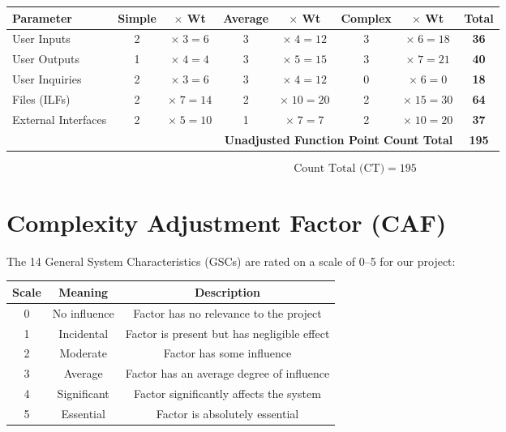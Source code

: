 \documentclass[11pt, a4paper]{article}
\begin{document}
\begin{center}
\renewcommand{\arraystretch}{1.3}
\begin{tabular}{|l|c|c|c|c|c|c|c|}
\hline
\textbf{Parameter} & \textbf{Simple} & \textbf{$\times$ Wt} & \textbf{Average} & \textbf{$\times$ Wt} & \textbf{Complex} & \textbf{$\times$ Wt} & \textbf{Total} \\ \hline
User Inputs            & 2 & $\times\;3 = 6$   & 3 & $\times\;4 = 12$  & 3 & $\times\;6 = 18$  & \textbf{36} \\ \hline
User Outputs           & 1 & $\times\;4 = 4$   & 3 & $\times\;5 = 15$  & 3 & $\times\;7 = 21$  & \textbf{40} \\ \hline
User Inquiries         & 2 & $\times\;3 = 6$   & 3 & $\times\;4 = 12$  & 0 & $\times\;6 = 0$   & \textbf{18} \\ \hline
Files (ILFs)           & 2 & $\times\;7 = 14$  & 2 & $\times\;10 = 20$ & 2 & $\times\;15 = 30$ & \textbf{64} \\ \hline
External Interfaces    & 2 & $\times\;5 = 10$  & 1 & $\times\;7 = 7$   & 2 & $\times\;10 = 20$ & \textbf{37} \\ \hline
\multicolumn{7}{|r|}{\textbf{Unadjusted Function Point Count Total}} & \textbf{195} \\ \hline
\end{tabular}
\end{center}

$$\boxed{\text{Count Total (CT)} = 195}$$

\newpage
\section{Complexity Adjustment Factor (CAF)}

The 14 General System Characteristics (GSCs) are rated on a scale of 0--5 for our project:

\begin{center}
\begin{tabular}{|c|c|c|}
\hline
\textbf{Scale} & \textbf{Meaning} & \textbf{Description} \\ \hline
0 & No influence    & Factor has no relevance to the project \\ \hline
1 & Incidental      & Factor is present but has negligible effect \\ \hline
2 & Moderate        & Factor has some influence \\ \hline
3 & Average         & Factor has an average degree of influence \\ \hline
4 & Significant     & Factor significantly affects the system \\ \hline
5 & Essential       & Factor is absolutely essential \\ \hline
\end{tabular}
\end{center}
\end{document}
